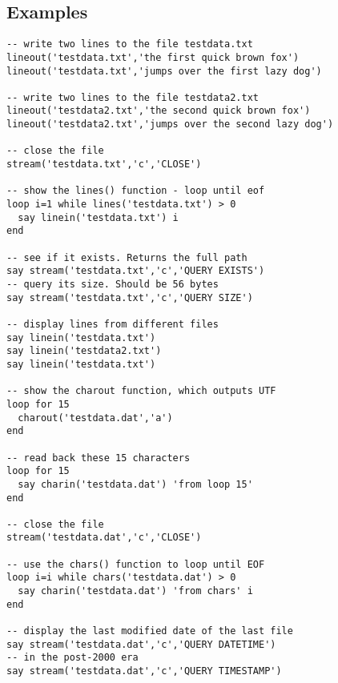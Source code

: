 \subsection{Examples}
\begin{lstlisting}[label=datessexample,caption=Example of using Date()]
-- write two lines to the file testdata.txt
lineout('testdata.txt','the first quick brown fox')
lineout('testdata.txt','jumps over the first lazy dog')

-- write two lines to the file testdata2.txt
lineout('testdata2.txt','the second quick brown fox')
lineout('testdata2.txt','jumps over the second lazy dog')

-- close the file
stream('testdata.txt','c','CLOSE')

-- show the lines() function - loop until eof
loop i=1 while lines('testdata.txt') > 0
  say linein('testdata.txt') i
end

-- see if it exists. Returns the full path
say stream('testdata.txt','c','QUERY EXISTS')
-- query its size. Should be 56 bytes
say stream('testdata.txt','c','QUERY SIZE')

-- display lines from different files 
say linein('testdata.txt')
say linein('testdata2.txt')
say linein('testdata.txt')

-- show the charout function, which outputs UTF
loop for 15
  charout('testdata.dat','a')
end

-- read back these 15 characters
loop for 15
  say charin('testdata.dat') 'from loop 15'
end

-- close the file
stream('testdata.dat','c','CLOSE')

-- use the chars() function to loop until EOF
loop i=i while chars('testdata.dat') > 0
  say charin('testdata.dat') 'from chars' i
end

-- display the last modified date of the last file
say stream('testdata.dat','c','QUERY DATETIME')
-- in the post-2000 era
say stream('testdata.dat','c','QUERY TIMESTAMP')

\end{lstlisting}
